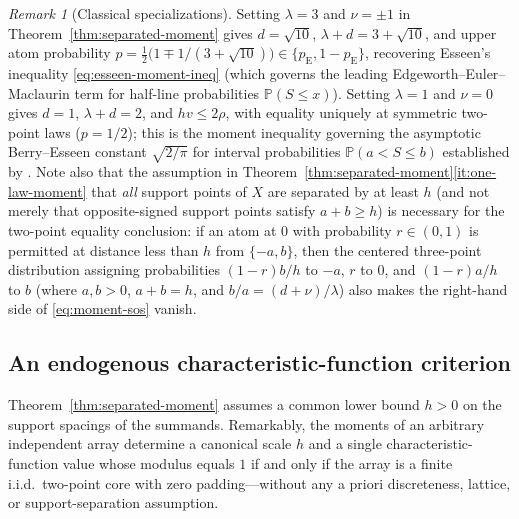 \documentclass[11pt]{article}
\numberwithin{equation}{section}
\theoremstyle{definition}
\theoremstyle{remark}
\newtheorem{remark}[theorem]{Remark}
\newcommand{\Pp}{\mathbb P}
\newcommand{\pe}{p_{\mathrm E}}
\begin{document}
\begin{remark}[Classical specializations]\label{rem:moment-specializations}
Setting $\lambda=3$ and $\nu=\pm1$ in Theorem~\ref{thm:separated-moment} gives
$d=\sqrt{10}$, $\lambda+d=3+\sqrt{10}$, and upper atom probability
$p=\frac12\bigl(1\mp 1/(3+\sqrt{10})\bigr)\in\{\pe,1-\pe\}$, recovering
Esseen's inequality \eqref{eq:esseen-moment-ineq} (which governs the leading
Edgeworth--Euler--Maclaurin term for half-line probabilities $\Pp(S\le x)$).
Setting $\lambda=1$ and $\nu=0$ gives $d=1$, $\lambda+d=2$, and $hv\le2\rho$,
with equality uniquely at symmetric two-point laws ($p=1/2$); this is the
moment inequality governing the asymptotic Berry--Esseen constant
$\sqrt{2/\pi}$ for interval probabilities $\Pp(a<S\le b)$ established by
\citet[Theorem~2.1 and Corollary~2.3]{DinevMattner2013}. Note also that the
assumption in Theorem~\ref{thm:separated-moment}\ref{it:one-law-moment} that
\emph{all} support points of $X$ are separated by at least $h$ (and not
merely that opposite-signed support points satisfy $a+b\ge h$) is necessary
for the two-point equality conclusion: if an atom at $0$ with probability
$r\in(0,1)$ is permitted at distance less than $h$ from $\{-a,b\}$, then the
centered three-point distribution assigning probabilities $(1-r)b/h$ to $-a$,
$r$ to $0$, and $(1-r)a/h$ to $b$ (where $a,b>0$, $a+b=h$, and
$b/a=(d+\nu)/\lambda$) also makes the right-hand side of
\eqref{eq:moment-sos} vanish.
\end{remark}

\subsection{An endogenous characteristic-function criterion}

Theorem~\ref{thm:separated-moment} assumes a common lower bound $h>0$ on the
support spacings of the summands. Remarkably, the moments of an arbitrary
independent array determine a canonical scale $\widehat h$ and a single
characteristic-function value whose modulus equals $1$ if and only if the
array is a finite i.i.d.\ two-point core with zero padding---without any a
priori discreteness, lattice, or support-separation assumption.
\end{document}
